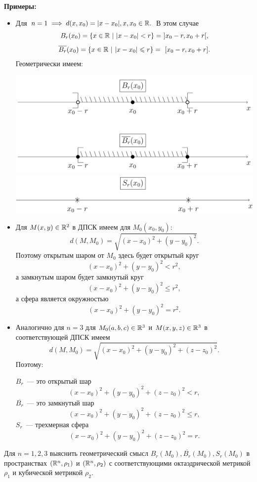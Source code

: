 \documentclass[../../main.tex]{subfiles}
\begin{document}
  \smallskip
  \textbf{Примеры:}
  \begin{itemize}
  \item Для $n = 1 \implies d(x, x_0) = |x - x_0|, x, x_0 \in \mathbb{R}.
  $ В этом случае 
  \[
    B_r(x_0) = \{x \in \mathbb{R}\ |\ |x - x_0| < r\} =\ ] x_0 - r, x_0 + r [,
  \]
  \[
    \overline{B_r}(x_0) = \{x \in \R\ |\ |x - x_0| \leqslant r\} =\ 
    [ x_0 - r, x_0 + r ].
  \]
  Геометрически имеем:
  
  \includegraphics[width=\linewidth]{2019-02-15_17-21-02.png}
  \includegraphics[width=\linewidth]{2019-02-15_17-21-17.png}
  
  \item  Для $M(x, y) \in \mathbb{R}^2$ в ДПСК имеем для $M_0(x_0, y_0)$:
  \[
    d(M, M_0) = \sqrt{(x - x_0)^2 + (y - y_0)^2}.
  \]
  Поэтому открытым шаром от $M_0$ здесь будет открытый круг 
  \[
    (x - x_0)^2 + (y - y_0)^2 < r^2,
  \]
  а замкнутым шаром будет замкнутый круг 
  \[
    (x - x_0)^2 + (y - y_0)^2 \leqslant r^2,
  \]
  а сфера является окружностью 
  \[
    (x - x_0)^2 + (y - y_0)^2 = r^2.
  \]
  
  \item Аналогично для $n = 3$ для $M_0(a, b, c) \in \mathbb{R}^3$ и $M(x, 
  y, z) \in \mathbb{R}^3$ в соответствующей ДПСК имеем  
  \[
    d(M, M_0) = \sqrt{(x - x_0)^2 + (y - y_0)^2 + (z - z_0)^2}.
  \]
  Поэтому:
  
  $B_r$~--- это открытый шар
  \[
    (x - x_0)^2 + (y - y_0)^2 + (z - z_0)^2 < r,
  \]
  $\overline{B_r}$~--- это замкнутый шар
  \[
  (x - x_0)^2 + (y - y_0)^2 + (z - z_0)^2 \leqslant r,
  \]  
  $S_r$~--- трехмерная сфера
  \[
  (x - x_0)^2 + (y - y_0)^2 + (z - z_0)^2 = r.
  \]
  \end{itemize}
  \begin{exc}
    Для $n = 1, 2, 3$  выяснить геометрический смысл $B_r(M_0), 
    \overline{B_r}(M_0),  S_r(M_0)$ в пространствах $(\mathbb{R}^n, \rho_1)$ 
    и $(\mathbb{R}^n, \rho_2)$  с соответствующими октаэдрической метрикой 
    $\rho_1$ и кубической метрикой $\rho_2$. 
  \end{exc}
\end{document}
